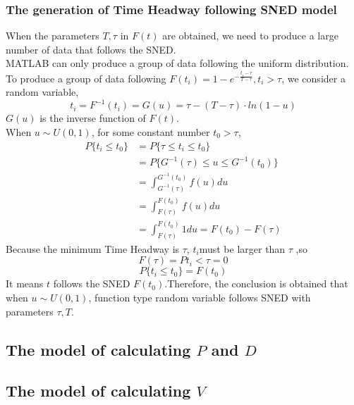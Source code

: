 \documentclass{mcmthesis}
\begin{document}
\subsubsection{The generation of Time Headway following SNED model}
\indent When the parameters $T, \tau $ in $F(t)$ are obtained, we need to produce a large number of data that follows the SNED.\\
\indent MATLAB can only produce a group of data following the uniform distribution. To produce a group of data following $ F(t_{i})=1-e^{-\frac{t_{i}-\tau}{T-\tau}},t_{i}>\tau $, we consider a random variable, 
\begin{equation}
	t_{i}=F^{-1}(t_{i})=G(u)=\tau-(T-\tau)\cdot ln(1-u)
\end{equation}
\indent $G(u)$ is the inverse function of $F(t)$.\\
\indent When $ u \sim U(0,1) $, for some constant number $t_{0}>\tau$,\\
\begin{equation}
\begin{split}
	P\{t_{i}\leqslant t_{0}\}&=P\{\tau\leqslant t_{i} \leqslant t_{0} \}\\
&=P\{ G^{-1}(\tau)\leqslant u \leqslant G^{-1}(t_{0})\}\\
&=\int_{G^{-1}(\tau)}^{G^{-1}(t_{0})}f(u)du\\
&=\int_{F(\tau)}^{F(t_{0})}f(u)du\\
&=\int_{F(\tau)}^{F(t_{0})}1du=F(t_{0})-F(\tau)
\end{split}
\end{equation}
\indent Because the minimum Time Headway is $\tau$, $ t_{i} $must be larger than $\tau$ ,so\\
\begin{equation}
	F(\tau)=P{t_{i}<\tau}=0
\end{equation}
\begin{equation}
	P\{t_{i} \leqslant t_{0} \}=F(t_{0})
\end{equation}
\indent It means $t$ follows the SNED $F(t_{0})$.Therefore, the conclusion is obtained that when $ u \sim U(0,1) $, function type random variable follows SNED with parameters $\tau , T $. \\

\subsection{The model of calculating $P$ and $D$}

\subsection{The model of calculating $V$}
\label{velocity change}
\end{document}
